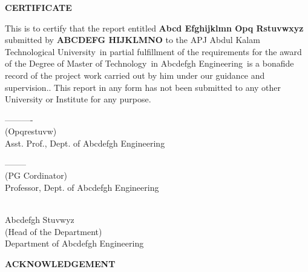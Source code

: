 \documentclass[12pt,a4paper]{report}
\def \reptitle{Abcd Efghijklmn Opq Rstuvwxyz}
\def \repauthor{ABCDEFG HIJKLMNO}
\def \repdegree{Master of Technology}
\def \repbranch{Abcdefgh Engineering}
\def \repsupervisor{Opqrestuvw}
\def \repuniversity{APJ Abdul Kalam Technological University}
\begin{document}
\center\textbf{\Large CERTIFICATE}

\justify
This is to certify that the report entitled \textbf{\large \reptitle} submitted by \textbf{\repauthor} to the \repuniversity\, in partial fulfillment of the requirements for the award of the Degree of \repdegree\, in \repbranch\,  is a bonafide record of the project work carried out by him under our guidance and supervision.. This report in any form has not been submitted to any other University or Institute for any purpose.

\vfill  %
\noindent
\parbox[b]{0.4\linewidth}{%
    \strut
    \centering  
    ----------\\
    (\repsupervisor) \\
    Asst. Prof., Dept. of 
    \repbranch } 
\hspace{2.5cm} %
\parbox[b]{0.4\linewidth}{%
    \strut
    \centering 
    -------- \\[0cm]%
    (PG Cordinator) \\
    Professor, Dept. of 
    \repbranch } 
    \par\vspace{0cm}
    


\vspace{0.5cm}
\begin{center}
\parbox[b]{0.4\linewidth}{%
    \strut
    \centering 
    \\[2cm]
    Abcdefgh Stuvwyz \\[0cm]%
    (Head of the Department) \\
    Department of \repbranch } 
    \par\vspace{0cm}
\end{center}
\newpage

{\centering \textbf{\Large ACKNOWLEDGEMENT} \par }

\end{document}
